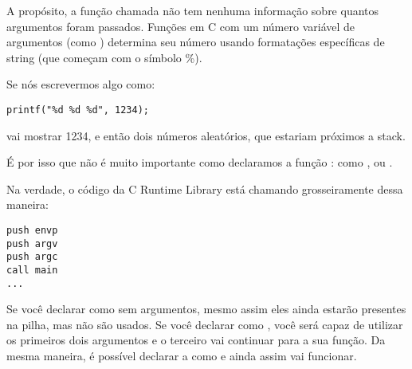 \par
A propósito, a função chamada não tem nenhuma informação sobre quantos argumentos foram passados.
Funções em C com um número variável de argumentos (como \printf) determina seu número usando formatações específicas de string (que começam com o símbolo \%).

Se nós escrevermos algo como:

\begin{lstlisting}
printf("%d %d %d", 1234);
\end{lstlisting}

\printf vai mostrar 1234, e então dois números aleatórios, que estariam próximos a stack.

\par
É por isso que não é muito importante como declaramos a função \main{}: como \main{},  ou .

Na verdade, o código da C Runtime Library está chamando grosseiramente \main{} dessa maneira:
	
\begin{lstlisting}
push envp
push argv
push argc
call main
...
\end{lstlisting}

Se você declarar \main como \main sem argumentos, mesmo assim eles ainda estarão presentes na pilha, mas não são usados.
Se você declarar \main como , você será capaz de utilizar os primeiros dois argumentos e o terceiro vai continuar  para a sua função.
Da mesma maneira, é possível declarar a \main como  e ainda assim vai funcionar.


